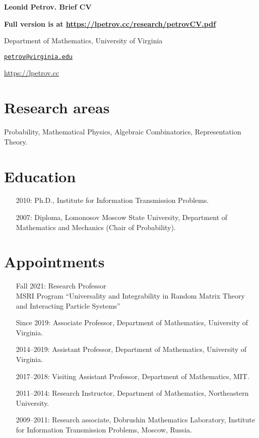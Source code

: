 \documentclass[letterpaper,11pt]{article}
\def\name{Leonid Petrov}
\begin{document}
\centerline{\huge \bf \name . Brief CV}
\bigskip

\textbf{Full version is at \url{https://lpetrov.cc/research/petrovCV.pdf}}

\noindent\hrulefill

\vspace{0.25in}

Department of Mathematics, University of Virginia

\href{mailto:petrov@virginia.edu}{\tt petrov@virginia.edu}

\url{https://lpetrov.cc}

\section*{Research areas}

Probability, Mathematical Physics, Algebraic Combinatorics, Representation
Theory.

\section*{Education}

\begin{itemize}
	\item [2010:]
		Ph.D., 
		Institute for Information Transmission Problems.

	\item [2007:]
		Diploma,
		Lomonosov Moscow State University,
		Department of Mathematics and Mechanics (Chair of Probability).
\end{itemize}

\section*{Appointments}

\begin{itemize}
	\item [Fall 2021:]
		  Research Professor
		  \\
		  MSRI Program ``Universality and Integrability in Random Matrix Theory and Interacting Particle Systems''
	\item
	      [Since 2019:]
	      Associate Professor, Department of Mathematics, University
		  of Virginia.
	\item
	      [2014--2019:]
				Assistant Professor, Department of Mathematics, University
				of Virginia.
	\item
	      [2017--2018:]
				Visiting Assistant Professor, Department of Mathematics, MIT.
	\item
	      [2011--2014:]
				Research Instructor, Department of Mathematics, Northeastern
				University.
	\item
	      [2009--2011:]
				Research associate, Dobrushin Mathematics Laboratory,
	      Institute for Information Transmission Problems, Moscow, Russia.
\end{itemize}
\end{document}
